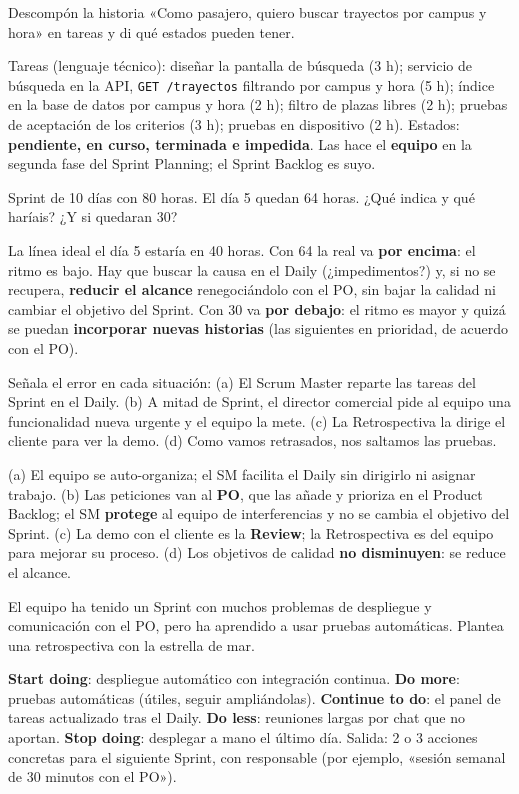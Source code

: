 \documentclass[11pt,a4paper,oneside,openany]{report}
\begin{document}
\begin{ejercicio}
Descompón la historia «Como pasajero, quiero buscar trayectos por campus y hora» en tareas y di qué estados pueden
tener.
\end{ejercicio}
Tareas (lenguaje técnico): diseñar la pantalla de búsqueda (3 h); servicio de búsqueda en la API, \texttt{GET /trayectos} filtrando por campus y hora (5 h);
índice en la base de datos por campus y hora (2 h); filtro de plazas libres (2 h); pruebas de aceptación de los
criterios (3 h); pruebas en dispositivo (2 h). Estados: \textbf{pendiente, en curso, terminada e impedida}. Las hace el
\textbf{equipo} en la segunda fase del Sprint Planning; el Sprint Backlog es suyo.

\begin{ejercicio}
Sprint de 10 días con 80 horas. El día 5 quedan 64 horas. ¿Qué indica y qué haríais? ¿Y si quedaran 30?
\end{ejercicio}
La línea ideal el día 5 estaría en 40 horas. Con 64 la real va \textbf{por encima}: el ritmo es bajo. Hay que buscar
la causa en el Daily (¿impedimentos?) y, si no se recupera, \textbf{reducir el alcance} renegociándolo con el PO, sin
bajar la calidad ni cambiar el objetivo del Sprint. Con 30 va \textbf{por debajo}: el ritmo es mayor y quizá se puedan
\textbf{incorporar nuevas historias} (las siguientes en prioridad, de acuerdo con el PO).

\begin{ejercicio}
Señala el error en cada situación: (a) El Scrum Master reparte las tareas del Sprint en el Daily. (b) A mitad de Sprint,
el director comercial pide al equipo una funcionalidad nueva urgente y el equipo la mete. (c) La Retrospectiva la
dirige el cliente para ver la demo. (d) Como vamos retrasados, nos saltamos las pruebas.
\end{ejercicio}
(a) El equipo se auto-organiza; el SM facilita el Daily sin dirigirlo ni asignar trabajo. (b) Las peticiones van al
\textbf{PO}, que las añade y prioriza en el Product Backlog; el SM \textbf{protege} al equipo de interferencias y no se
cambia el objetivo del Sprint. (c) La demo con el cliente es la \textbf{Review}; la Retrospectiva es del equipo para
mejorar su proceso. (d) Los objetivos de calidad \textbf{no disminuyen}: se reduce el alcance.

\begin{ejercicio}
El equipo ha tenido un Sprint con muchos problemas de despliegue y comunicación con el PO, pero ha aprendido a usar
pruebas automáticas. Plantea una retrospectiva con la estrella de mar.
\end{ejercicio}
\textbf{Start doing}: despliegue automático con integración continua. \textbf{Do more}: pruebas automáticas (útiles,
seguir ampliándolas). \textbf{Continue to do}: el panel de tareas actualizado tras el Daily. \textbf{Do less}:
reuniones largas por chat que no aportan. \textbf{Stop doing}: desplegar a mano el último día. Salida: 2 o 3 acciones
concretas para el siguiente Sprint, con responsable (por ejemplo, «sesión semanal de 30 minutos con el PO»).
\end{document}
